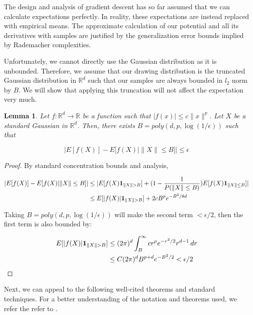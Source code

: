 \documentclass[11pt]{article}
\newtheorem{lemma}[theorem]{Lemma}
\newcommand{\R}{{\mathbb{R}}}
\begin{document}
The design and analysis of gradient descent has so far assumed that we can calculate expectations perfectly. In reality, these expectations are instead replaced with empirical means. The approximate calculation of our potential and all its derivatives with samples are justified by the generalization error bounds implied by Rademacher complexities. 

Unfortunately, we cannot directly use the Gaussian distribution as it is unbounded. Therefore, we assume that our drawing distribution is the truncated Gaussian distribution in $\R^d$ such that our samples are always bounded in $l_2$ norm by $B$. We will show that applying this truncation will not affect the expectation very much.


\begin{lemma}
\label{choppedLem}
Let $f : \R^d \to \R$ be a function such that $|f(x)| \leq c\|x\|^p$. Let $X$ be a standard Gaussian in $\R^d$. Then, there exists $B = poly(d,p,\log(1/\epsilon))$ such that 

\[ |E[f(X)] - E[f(X)| \|X\|\leq B]| \leq \epsilon\]
\end{lemma}

\begin{proof}

By standard concentration bounds and analysis, 

\begin{align*}
|E[f(X)] - E[f(X)| \|X\|\leq B]| &\leq |E[f(X){\bf 1}_{\|X\|>B}] + (1- \frac{1}{P(\|X\|\leq B)}) E[f(X){\bf 1}_{\|X\|\leq B}]|\\
&\leq E[|f(X)|{\bf 1}_{\|X\|>B}] + 2cB^pe^{-B^2/8d}
\end{align*}

Taking $B = poly(d,p,\log(1/\epsilon))$ will make the second term $< \epsilon/2$, then the first term is also bounded by:

\begin{align*}
    E[|f(X)|{\bf 1}_{\|X\|>B}] &\leq (2\pi)^d \int_B^\infty cr^pe^{-r^2/2}r^{d-1}\,dr \\
    &\leq C(2\pi)^dB^{p+d}e^{-B^2/2} < \epsilon/2
\end{align*}

\end{proof}

Next, we can appeal to the following well-cited theorems and standard techniques. For a better understanding of the notation and theorems used, we refer the refer to \cite{bartlett2002rademacher}.
\end{document}
